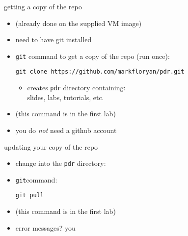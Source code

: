 \begin{frame}[fragile,label=repoCopy]{getting a copy of the repo}
    \begin{itemize}
        \item (already done on the supplied VM image)
        \item need to have git installed
        \item {\tt git} command to get a copy of the repo (run once): \\
\begin{framed}
\begin{lstlisting}[language={},basicstyle=\sourcecodepro\fontsize{11}{12}\selectfont]
git clone https://github.com/markfloryan/pdr.git
\end{lstlisting}
\end{framed}
            \begin{itemize}
                \item creates {\tt pdr} directory containing: \\
                        slides, labs, tutorials, etc.
            \end{itemize}
        \item (this command is in the first lab)
        \item you do \textit{not} need a github account
    \end{itemize}
\end{frame}

\begin{frame}{updating your copy of the repo}
    \begin{itemize}
        \item change into the {\tt pdr} directory: \\
        \item {\tt git}command: \\ \begin{framed}{\tt git pull}\end{framed}
        \item (this command is in the first lab)
        \item error messages? you 
    \end{itemize}
\end{frame}

